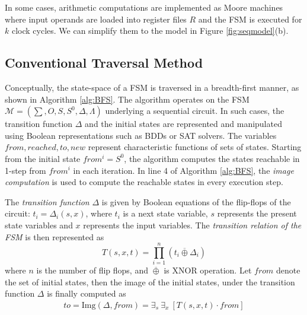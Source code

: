 In some cases, arithmetic computations are implemented as Moore machines where input operands
are loaded into register files $R$ and the FSM is executed for $k$ clock cycles.
We can simplify them to the model in Figure \ref{fig:seqmodel}(b).

\begin{figure}[bp]
\end{figure}

\subsection{Conventional Traversal Method}
Conceptually, the state-space of a FSM is traversed in a breadth-first
manner, as shown in Algorithm \ref{alg:BFS}. %
The algorithm operates on the FSM $\mathcal{M} = (\sum, O, S, S^0,
\Delta, \Lambda)$ underlying a sequential circuit. In such cases, the
transition function $\Delta$ and the initial states are represented
and manipulated using Boolean representations such as BDDs or SAT
solvers. The variables $from, reached, to, new$ represent
characteristic functions of sets of states. Starting from the initial
state $from^i = S^0$, the algorithm computes the states reachable in
1-step from $from^i$ in each iteration. In line 4 of Algorithm
\ref{alg:BFS}, the {\it image computation} is 
used to compute the reachable states in every execution step. 

The {\it transition function} $\Delta$ is given by Boolean equations
  of the flip-flops of the circuit: $t_i = \Delta_i(s, x)$, where
  $t_i$ is a next state variable, $s$ represents the present   state
  variables and $x$ represents the input variables. The {\it
    transition relation of the FSM} is then represented as  
\begin{equation} 
T(s, x, t) =   \prod_{i=1}^{n} (t_i \overline{\oplus } \Delta_i)
\end{equation}
where $n$ is the number of flip flops, and $\overline{\oplus}$ is XNOR
operation. Let $from$ denote the set of initial states, then the
image of the initial states, under the transition function $\Delta$ is
finally computed as
\begin{align}
\label{eqn:img}
to = \text{Img}(\Delta, from) = \exists _s ~\exists _x ~[ T(s, x, t)
  \cdot from ] 
\end{align}

